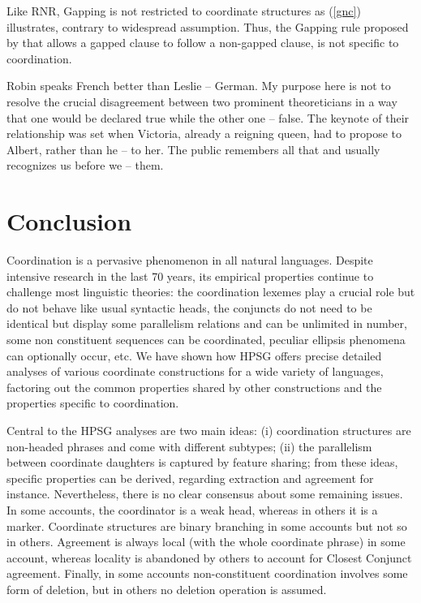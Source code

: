 {Like RNR, Gapping is not restricted to coordinate structures as (\ref{gnc}) illustrates, contrary to
widespread assumption.   Thus, the Gapping rule proposed by \citet{sangheepark}  that allows a gapped clause to follow a non-gapped clause, is not specific to coordination. 

\begin{exe}
\ex 
\begin{xlista}
\ex Robin speaks French better than Leslie -- German.
\ex My purpose here is not to resolve the crucial disagreement between two prominent theoreticians in a way that one would be declared true while the other one -- false.
\ex The keynote of their relationship was set when Victoria, already a reigning queen,
had to propose to Albert, rather than he -- to her.
\ex The public remembers all that and usually recognizes us before we -- them.\\
\citep[]{sangheepark}
\end{xlista}\label{gnc}
\end{exe}




\section{Conclusion}

Coordination is a pervasive phenomenon in all natural languages. Despite intensive research in the last 70 years, its empirical properties continue to challenge most linguistic theories:  the coordination lexemes play a crucial role but do not behave like usual syntactic heads, the conjuncts do not need to be identical but display some parallelism relations and can be unlimited in number, some non constituent sequences can be coordinated, peculiar ellipsis phenomena can optionally occur,  etc. We have shown how HPSG offers precise detailed analyses of various coordinate constructions for a wide variety of languages, factoring out the common properties shared by other constructions and the properties specific to coordination.

Central to the HPSG analyses are two main ideas: (i) coordination structures are non-headed phrases and come with different subtypes; (ii) the parallelism between coordinate daughters is captured by feature sharing; from these ideas, specific properties can be derived, regarding extraction and agreement for instance. Nevertheless, there is no clear consensus about some remaining issues. In some accounts, the coordinator is a weak head, whereas in others it is a marker. Coordinate structures are binary branching in some accounts but not so in others. Agreement is always local (with the whole coordinate phrase) in some account, whereas locality is abandoned by others to account for Closest Conjunct agreement. Finally, in some accounts non-constituent coordination involves some form of deletion, but in others no deletion operation is assumed.

}%
 
